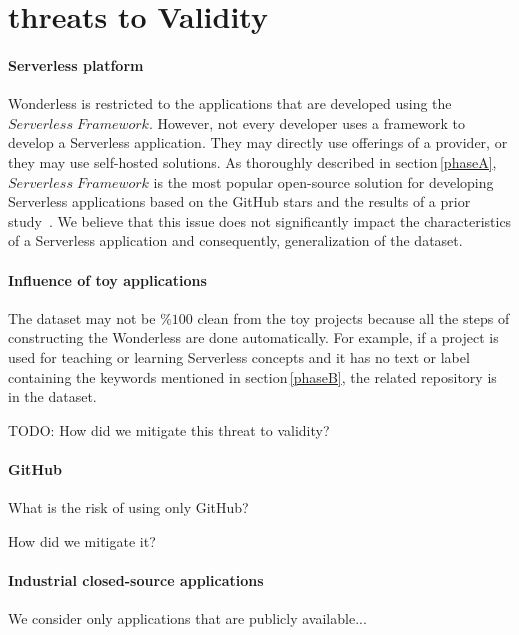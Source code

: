 \section{threats to Validity}
\label{limitations}

\paragraph{Serverless platform}
Wonderless is restricted to the applications 
that are developed using the $Serverless \; Framework$. 
However, not every developer uses a framework to develop a Serverless application. 
They may directly use offerings of a provider, or they may use self-hosted solutions. 
%
As thoroughly 
described in section\,\ref{phaseA}, $Serverless \; Framework$ is the 
most popular open-source solution for developing Serverless applications 
based on the GitHub stars and the results of a prior study~\cite{kritikos2018review}. 
We believe that this issue does not significantly impact the characteristics of a 
Serverless application and consequently, generalization of the dataset.

\paragraph{Influence of toy applications}
The dataset may not be $\%100$ clean from the toy projects 
because all the steps of constructing the Wonderless are done automatically. 
For example, if a project is used for teaching or learning Serverless concepts 
and it has no text or label containing the keywords mentioned in 
section\,\ref{phaseB}, the related repository is in the dataset.

TODO: How did we mitigate this threat to validity?

\paragraph{GitHub}
What is the risk of using only GitHub?

How did we mitigate it?

\paragraph{Industrial closed-source applications}
We consider only applications that are publicly available...












